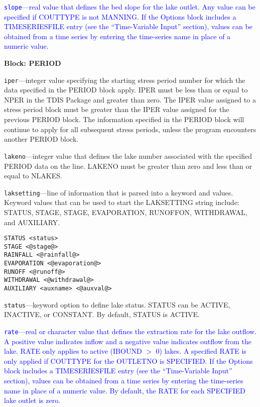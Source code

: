 \begin{description}
\item \textcolor{blue}{\texttt{slope}---real value that defines the bed slope for the lake outlet. Any value can be specified if COUTTYPE is not MANNING. If the Options block includes a TIMESERIESFILE entry (see the ``Time-Variable Input'' section), values can be obtained from a time series by entering the time-series name in place of a numeric value.}

\end{description}
\item \textbf{Block: PERIOD}

\begin{description}
\item \texttt{iper}---integer value specifying the starting stress period number for which the data specified in the PERIOD block apply.  IPER must be less than or equal to NPER in the TDIS Package and greater than zero.  The IPER value assigned to a stress period block must be greater than the IPER value assigned for the previous PERIOD block.  The information specified in the PERIOD block will continue to apply for all subsequent stress periods, unless the program encounters another PERIOD block.

\item \texttt{lakeno}---integer value that defines the lake number associated with the specified PERIOD data on the line. LAKENO must be greater than zero and less than or equal to NLAKES.

\item \texttt{laksetting}---line of information that is parsed into a keyword and values.  Keyword values that can be used to start the LAKSETTING string include: STATUS, STAGE, STAGE, EVAPORATION, RUNOFFON, WITHDRAWAL, and AUXILIARY.

\begin{lstlisting}[style=blockdefinition]
STATUS <status>
STAGE <@stage@>
RAINFALL <@rainfall@>
EVAPORATION <@evaporation@>
RUNOFF <@runoff@>
WITHDRAWAL <@withdrawal@>
AUXILIARY <auxname> <@auxval@> 
\end{lstlisting}

\item \texttt{status}---keyword option to define lake status.  STATUS can be ACTIVE, INACTIVE, or CONSTANT. By default, STATUS is ACTIVE.

\item \textcolor{blue}{\texttt{rate}---real or character value that defines the extraction rate for the lake outflow. A positive value indicates inflow and a negative value indicates outflow from the lake. RATE only applies to active (IBOUND $>$ 0) lakes. A specified RATE is only applied if COUTTYPE for the OUTLETNO is SPECIFIED. If the Options block includes a TIMESERIESFILE entry (see the ``Time-Variable Input'' section), values can be obtained from a time series by entering the time-series name in place of a numeric value. By default, the RATE for each SPECIFIED lake outlet is zero.}


\end{description}

